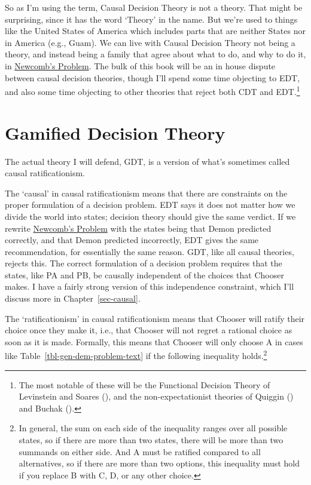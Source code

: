 \documentclass[
  12pt,
  letterpaper,
  DIV=11,
  numbers=noendperiod]{scrreprt}
\begin{document}
So as I'm using the term, Causal Decision Theory is not a theory. That
might be surprising, since it has the word `Theory' in the name. But
we're used to things like the United States of America which includes
parts that are neither States nor in America (e.g., Guam). We can live
with Causal Decision Theory not being a theory, and instead being a
family that agree about what to do, and why to do it, in
\hyperref[tbl-newcomb]{Newcomb's Problem}. The bulk of this book will be
an in house dispute between causal decision theories, though I'll spend
some time objecting to EDT, and also some time objecting to other
theories that reject both CDT and EDT.\footnote{The most notable of
  these will be the Functional Decision Theory of Levinstein and Soares
  (), and the
  non-expectationist theories of Quiggin
  () and Buchak
  ().}

\section{Gamified Decision Theory}\label{sec-gdt-defined}

The actual theory I will defend, GDT, is a version of what's sometimes
called causal ratificationism.

The `causal' in causal ratificationism means that there are constraints
on the proper formulation of a decision problem. EDT says it does not
matter how we divide the world into states; decision theory should give
the same verdict. If we rewrite \hyperref[tbl-newcomb]{Newcomb's
Problem} with the states being that Demon predicted correctly, and that
Demon predicted incorrectly, EDT gives the same recommendation, for
essentially the same reason. GDT, like all causal theories, rejects
this. The correct formulation of a decision problem requires that the
states, like PA and PB, be causally independent of the choices that
Chooser makes. I have a fairly strong version of this independence
constraint, which I'll discuss more in Chapter~\ref{sec-causal}.

The `ratificationism' in causal ratificationism means that Chooser will
ratify their choice once they make it, i.e., that Chooser will not
regret a rational choice as soon as it is made. Formally, this means
that Chooser will only choose A in cases like
Table~\ref{tbl-gen-dem-problem-text} if the following inequality
holds.\footnote{In general, the sum on each side of the inequality
  ranges over all possible states, so if there are more than two states,
  there will be more than two summands on either side. And A must be
  ratified compared to all alternatives, so if there are more than two
  options, this inequality must hold if you replace B with C, D, or any
  other choice.}
\end{document}
